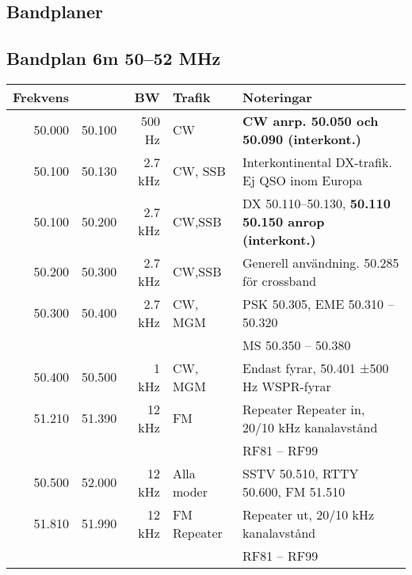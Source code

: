 \begin{landscape}
\section{Bandplaner}
	\subsection{Bandplan 6m 50--52 MHz}
	\begin{tabular}{rrrll}
		\textbf{Frekvens} &               & \textbf{BW}   & \textbf{Trafik}     & \textbf{Noteringar}                                          \\ \hline
		           50.000 & 50.100        & 500 Hz        & CW                  & \textbf{CW anrp. 50.050 och 50.090 (interkont.)}             \\ \hline
		           50.100 & 50.130        & 2.7 kHz       & CW, SSB             & Interkontinental DX-trafik. Ej QSO inom Europa               \\ \hline
		           50.100 & 50.200        & 2.7 kHz       & CW,SSB              & DX 50.110--50.130, \textbf{50.110 50.150 anrop (interkont.)} \\ \hline
		           50.200 & 50.300        & 2.7 kHz       & CW,SSB              & Generell användning. 50.285 för crossband                    \\ \hline
		           50.300 & 50.400        & 2.7 kHz       & CW, MGM             & PSK 50.305, EME 50.310 – 50.320                              \\
		                  &               &               &                     & MS 50.350 – 50.380                                           \\ \hline
		           50.400 & 50.500        & 1 kHz         & CW, MGM             & Endast fyrar, 50.401 ±500 Hz WSPR-fyrar                      \\ \hline
		           51.210 & 51.390        & 12 kHz        & FM                  & Repeater Repeater in, 20/10 kHz kanalavstånd                 \\
		                  &               &               &                     & RF81 – RF99                                                  \\ \hline
		           50.500 & 52.000        & 12 kHz        & Alla moder          & SSTV 50.510, RTTY 50.600, FM 51.510                          \\ \hline
		           51.810 & 51.990        & 12 kHz        & FM Repeater         & Repeater ut, 20/10 kHz kanalavstånd                          \\
		                  &               &               &                     & RF81 – RF99                                                  \\ \hline
\end{tabular}
\clearpage

\end{landscape}
